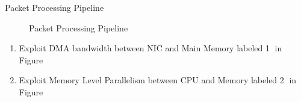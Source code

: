 \documentclass[final]{beamer}
\newlength{\onecolwid}
\begin{document}
\begin{frame}
\begin{columns}[t]
\begin{column}{\onecolwid}
\begin{exampleblock}{Packet Processing Pipeline}
\begin{figure}
\caption{Packet Processing Pipeline}
\end{figure}
\begin{enumerate}[*]
 \item Exploit DMA bandwidth between NIC and Main Memory labeled \textcircled{1} in Figure
 \item Exploit Memory Level Parallelism between CPU and Memory labeled \textcircled{2} in Figure
\end{enumerate}
\end{exampleblock}




\end{column}
\end{columns}
\end{frame}
\end{document}
